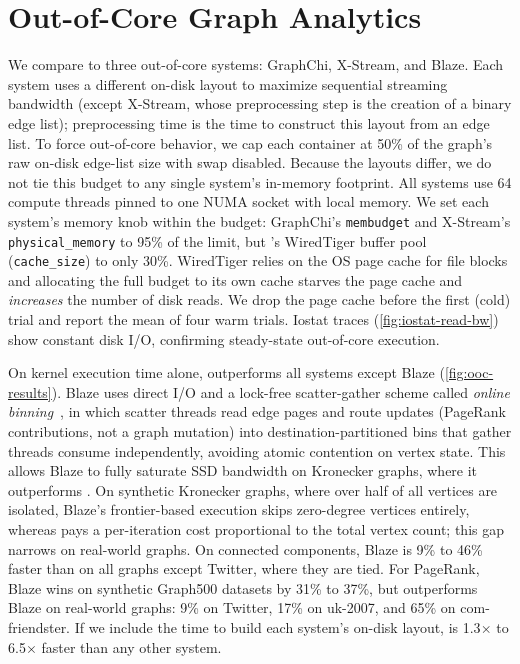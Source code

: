 \section{Out-of-Core Graph Analytics}
\label{sec:eval:ooc}

%
We compare \project{} to three out-of-core systems: GraphChi, X-Stream, and Blaze.
Each system uses a different on-disk layout to maximize sequential streaming bandwidth (except X-Stream, whose preprocessing step is the creation of a binary edge list); preprocessing time is the time to construct this layout from an edge list.
To force out-of-core behavior, we cap each container at 50\% of the graph's raw on-disk edge-list size with swap disabled. Because the layouts differ, we do not tie this budget to any single system's in-memory footprint.
All systems use 64 compute threads pinned to one NUMA socket with local
memory.
We set each system's memory knob within the budget: GraphChi's \texttt{membudget} and X-Stream's \texttt{physical\_memory} to 95\% of the limit, but \project{}'s WiredTiger buffer pool (\texttt{cache\_size}) to only 30\%.
WiredTiger relies on the OS page cache for file blocks and allocating the full budget to its own cache starves the page cache and \emph{increases} the number of disk reads.
We drop the page cache before the first (cold) trial and report the mean of four warm trials.
Iostat traces (\autoref{fig:iostat-read-bw}) show constant disk I/O, confirming steady-state out-of-core execution.

On kernel execution time alone, \project{} outperforms all systems except Blaze (\autoref{fig:ooc-results}).
Blaze uses direct I/O and a lock-free scatter-gather scheme called \emph{online binning}~\cite{kim2022blaze}, in which scatter threads read edge pages and route updates (PageRank contributions, not a graph mutation) into destination-partitioned bins that gather threads consume independently, avoiding atomic contention on vertex state.
This allows Blaze to fully saturate SSD bandwidth on Kronecker graphs,
where it outperforms \project{}.
On synthetic Kronecker graphs, where over half of all vertices are isolated, Blaze's frontier-based execution skips zero-degree vertices entirely, whereas \project{} pays a per-iteration cost proportional to the total vertex count; this gap narrows on real-world graphs.
On connected components, Blaze is 9\% to 46\% faster than \project{} on all graphs except Twitter, where they are tied.
For PageRank, Blaze wins on synthetic Graph500 datasets by 31\% to 37\%, but \project{} outperforms Blaze on real-world graphs: 9\% on Twitter, 17\% on uk-2007, and 65\% on com-friendster.
If we include the time to build each system's on-disk layout, \project{} is 1.3$\times$ to 6.5$\times$ faster than any other system.

